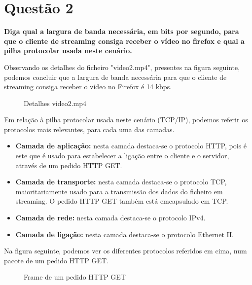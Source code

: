 \documentclass[a4paper, 11pt]{article}
\begin{document}
\section{Questão 2}
\textbf{Diga qual a largura de banda necessária, em bits por segundo, para que o cliente de streaming consiga receber o
vídeo no firefox e qual a pilha protocolar usada neste cenário.}
\vspace{0.25cm}

Observando os detalhes do ficheiro "video2.mp4", presentes na figura seguinte, podemos concluir que a largura de banda necessária para que o cliente de streaming consiga receber o vídeo no Firefox é 14 kbps.

\begin{figure}[H]
    \centering
    \caption{Detalhes video2.mp4}
\end{figure}

Em relação à pilha protocolar usada neste cenário (TCP/IP), podemos referir os protocolos mais relevantes, para cada uma das camadas.

\begin{itemize}
    \item \textbf{Camada de aplicação:} nesta camada destaca-se o protocolo HTTP, pois é este que é usado para estabelecer a ligação entre o cliente e o servidor, através de um pedido HTTP GET.
    \item \textbf{Camada de transporte:} nesta camada destaca-se o protocolo TCP, maioritariamente usado para a transmissão dos dados do ficheiro em streaming. O pedido HTTP GET também está emcapsulado em TCP.
    \item \textbf{Camada de rede:} nesta camada destaca-se o protocolo IPv4.
    \item \textbf{Camada de ligação:} nesta camada destaca-se o protocolo Ethernet II.
\end{itemize}

Na figura seguinte, podemos ver os diferentes protocolos referidos em cima, num pacote de um pedido HTTP GET.

\begin{figure}[H]
    \centering
    \caption{Frame de um pedido HTTP GET}
\end{figure}
\end{document}
